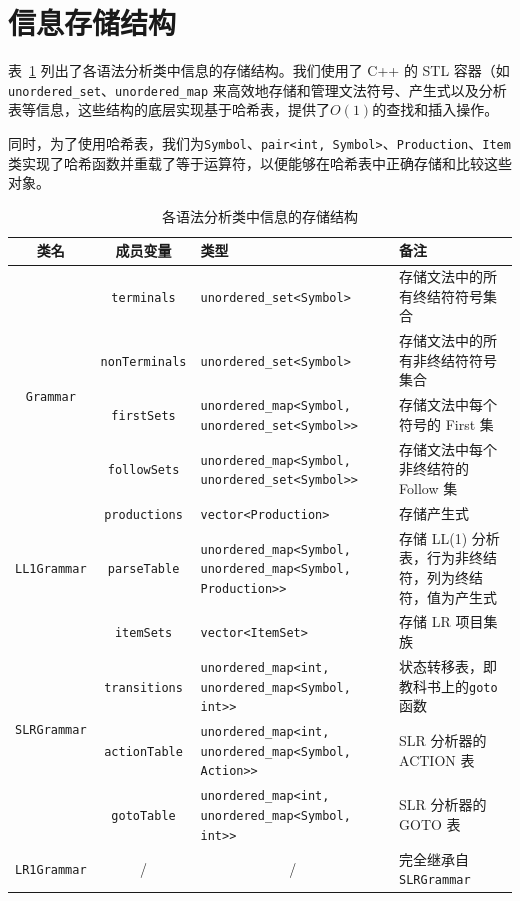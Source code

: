 \documentclass[UTF8,openany]{ctexbook}
\begin{document}
\section{信息存储结构}

表~\ref{tab:grammar_structure} 列出了各语法分析类中信息的存储结构。我们使用了 C++ 的 STL 容器（如 \texttt{unordered\_set}、\texttt{unordered\_map} 来高效地存储和管理文法符号、产生式以及分析表等信息，这些结构的底层实现基于哈希表，提供了$O(1)$的查找和插入操作。

同时，为了使用哈希表，我们为\texttt{Symbol}、\texttt{pair<int, Symbol>}、\texttt{Production}、\texttt{Item}类实现了哈希函数并重载了等于运算符，以便能够在哈希表中正确存储和比较这些对象。

\begin{table}[htbp] \small
\centering
\caption{各语法分析类中信息的存储结构}
\label{tab:grammar_structure}
\begin{tabular}{@{}ccp{6cm}p{3cm}@{}}
\toprule
\textbf{类名} & \textbf{成员变量} & \textbf{类型} & \textbf{备注} \\
\midrule

\multirow{5}{*}{\texttt{Grammar}} 
& \texttt{terminals}       & \texttt{unordered\_set<Symbol>} & 存储文法中的所有终结符符号集合 \\
& \texttt{nonTerminals}    & \texttt{unordered\_set<Symbol>} & 存储文法中的所有非终结符符号集合 \\
& \texttt{firstSets}       & \texttt{unordered\_map<Symbol, unordered\_set<Symbol>>} & 存储文法中每个符号的 First 集 \\
& \texttt{followSets}      & \texttt{unordered\_map<Symbol, unordered\_set<Symbol>>} & 存储文法中每个非终结符的 Follow 集 \\
& \texttt{productions}     & \texttt{vector<Production>} & 存储产生式 \\
\midrule

\multirow{1}{*}{\texttt{LL1Grammar}} 
& \texttt{parseTable}      & \texttt{unordered\_map<Symbol, unordered\_map<Symbol, Production>>} & 存储 LL(1) 分析表，行为非终结符，列为终结符，值为产生式 \\
\midrule

\multirow{4}{*}{\texttt{SLRGrammar}} 
& \texttt{itemSets}        & \texttt{vector<ItemSet>} & 存储 LR 项目集族 \\
& \texttt{transitions}     & \texttt{unordered\_map<int, unordered\_map<Symbol, int>>} & 状态转移表，即教科书上的\texttt{goto}函数 \\
& \texttt{actionTable}     & \texttt{unordered\_map<int, unordered\_map<Symbol, Action>>} & SLR 分析器的 ACTION 表\\
& \texttt{gotoTable}       & \texttt{unordered\_map<int, unordered\_map<Symbol, int>>} & SLR 分析器的 GOTO 表\\

\midrule

\texttt{LR1Grammar} & \multicolumn{1}{c}{/} & \multicolumn{1}{c}{/} & 完全继承自 \texttt{SLRGrammar} \\
\bottomrule
\end{tabular}
\end{table}
\end{document}
